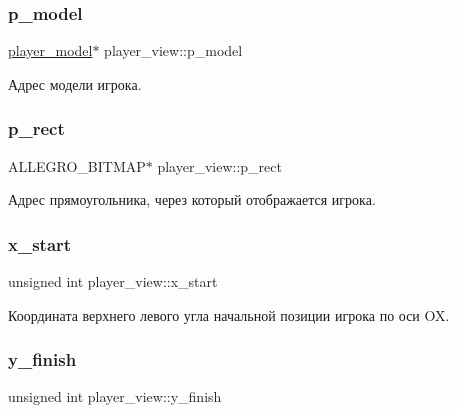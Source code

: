 \subsubsection{\texorpdfstring{p\+\_\+model}{p\_model}}
{\footnotesize\ttfamily \hyperlink{structplayer__model}{player\+\_\+model}$\ast$ player\+\_\+view\+::p\+\_\+model}



Адрес модели игрока. 

\mbox{\label{structplayer__view_adcfa5be54e3ef23cbd19acdcfef206c4}} 
\subsubsection{\texorpdfstring{p\+\_\+rect}{p\_rect}}
{\footnotesize\ttfamily A\+L\+L\+E\+G\+R\+O\+\_\+\+B\+I\+T\+M\+AP$\ast$ player\+\_\+view\+::p\+\_\+rect}



Адрес прямоугольника, через который отображается игрока. 

\mbox{\label{structplayer__view_ae75fedba07d294d1f98716a0023641e6}} 
\subsubsection{\texorpdfstring{x\+\_\+start}{x\_start}}
{\footnotesize\ttfamily unsigned int player\+\_\+view\+::x\+\_\+start}



Координата верхнего левого угла начальной позиции игрока по оси OX. 

\mbox{\label{structplayer__view_ad5e7e7b6013080b75bb111b86634571d}} 
\subsubsection{\texorpdfstring{y\+\_\+finish}{y\_finish}}
{\footnotesize\ttfamily unsigned int player\+\_\+view\+::y\+\_\+finish}



